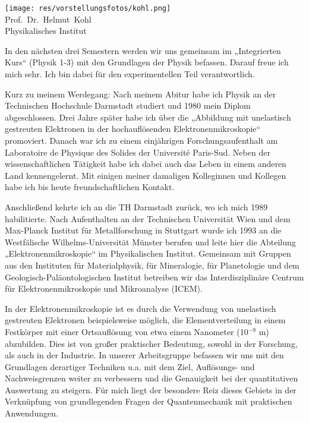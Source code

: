 \begin{center}
\end{center}
\newpage

\begin{multicols}{2}
\begin{center}
	\texttt{[image: res/vorstellungsfotos/kohl.png]}\\
\smallskip
	Prof.\ Dr.\ Helmut\ Kohl\\
	Physikalisches Institut
\end{center}

In den nächsten drei Semestern werden wir uns gemeinsam im „Integrierten Kurs“ (Physik 1-3) mit den Grundlagen der Physik befassen. Darauf freue ich mich sehr. Ich bin dabei für den experimentellen Teil verantwortlich.

Kurz zu meinem Werdegang: Nach meinem Abitur habe ich Physik an der Technischen Hochschule Darmstadt studiert und 1980 mein Diplom abgeschlossen. Drei Jahre später habe ich über die „Abbildung mit unelastisch gestreuten Elektronen in der hochauflösenden Elektronenmikroskopie“ promoviert. Danach war ich zu einem einjährigen Forschungsaufenthalt am Laboratoire de Physique des Solides der Université Paris-Sud. Neben der wissenschaftlichen Tätigkeit habe ich dabei auch das Leben in einem anderen Land kennengelernt. Mit einigen meiner damaligen Kolleginnen und Kollegen habe ich bis heute freundschaftlichen Kontakt.

Anschließend kehrte ich an die TH Darmstadt zurück, wo ich mich 1989 habilitierte. Nach Aufenthalten an der Technischen Universität Wien und dem Max-Planck Institut für Metallforschung in Stuttgart wurde ich 1993 an die Westfälische Wilhelms-Universität Münster berufen und leite hier die Abteilung „Elektronenmikroskopie“ im Physikalischen Institut.  Gemeinsam mit Gruppen aus den Instituten für Materialphysik, für Mineralogie, für Planetologie und dem Geologisch-Paläontologischen Institut betreiben wir das Interdisziplinäre Centrum für Elektronenmikroskopie und Mikroanalyse (ICEM).

In der Elektronenmikroskopie ist es durch die Verwendung von unelastisch gestreuten Elektronen beispielsweise möglich, die Elementverteilung in einem Festkörper mit einer Ortsauflösung von etwa einem Nanometer (10$^{-9}$ m) abzubilden. Dies ist von großer praktischer Bedeutung, sowohl in der Forschung, als auch in der Industrie. In unserer Arbeitsgruppe befassen wir uns mit den Grundlagen derartiger Techniken u.a. mit dem Ziel, Auflösungs- und Nachweisgrenzen weiter  zu verbessern und die Genauigkeit bei der quantitativen Auswertung zu steigern. Für mich liegt der besondere Reiz dieses Gebiets in der Verknüpfung von grundlegenden Fragen der Quantenmechanik mit praktischen Anwendungen.


\end{multicols}

